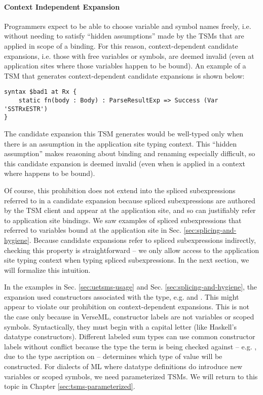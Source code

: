 \paragraph{Context Independent Expansion} Programmers expect to be able to choose variable and symbol names freely, i.e. without needing to satisfy ``hidden assumptions'' made by the TSMs that are applied in scope of a binding. For this reason, context-dependent candidate expansions, i.e. those with free variables or symbols, are deemed invalid (even at application sites where those variables happen to be bound). An example of a TSM that generates context-dependent candidate expansions is shown below:
\begin{lstlisting}[numbers=none]
syntax $bad1 at Rx {
	static fn(body : Body) : ParseResultExp => Success (Var 'SSTRxESTR')
}
\end{lstlisting}
The candidate expansion this TSM generates would be well-typed only when there is an assumption  in the application site typing context. This ``hidden assumption'' makes reasoning about binding and renaming especially difficult, so this candidate expansion is deemed invalid (even when  is applied in a context where  happens to be bound).

Of course, this prohibition does not extend into the spliced subexpressions referred to in a candidate expansion because spliced subexpressions are authored by the TSM client and appear at the application site, and so can justifiably refer to application site bindings. We saw examples of spliced subexpressions that referred to variables bound at the application site in Sec. \ref{sec:splicing-and-hygiene}. Because candidate expansions refer to spliced subexpressions indirectly, checking this property is straightforward -- we only allow access to the application site typing context when typing spliced subexpressions. In the next section, we will formalize this intuition. %

In the examples in Sec. \ref{sec:uetsms-usage} and Sec. \ref{sec:splicing-and-hygiene}, the expansion used constructors associated with the  type, e.g.  and . This might appear to violate our prohibition on context-dependent expansions. This is not the case only because in VerseML, constructor labels are not variables or scoped symbols. Syntactically, they must begin with a capital letter (like Haskell's datatype constructors). Different labeled sum types can use common constructor labels without conflict because the type the term is being checked against -- e.g. , due to the type ascription on  -- determines which type of value will be constructed. For dialects of ML where datatype definitions do introduce new variables or scoped symbols, we need parameterized TSMs. We will return to this topic in Chapter \ref{sec:tsms-parameterized}. %

